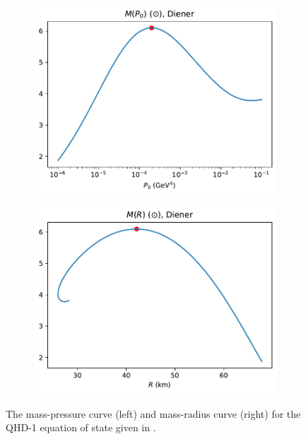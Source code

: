 \begin{figure}[t]
    \centering
    \begin{subfigure}{.5\textwidth}
        \includegraphics[width=\textwidth]{images/qhd1/p0_analysis.pdf}
    \end{subfigure}%
    \begin{subfigure}{.5\textwidth}
        \includegraphics[width=\textwidth]{images/qhd1/r_analysis.pdf}
    \end{subfigure}
    \caption{The mass-pressure curve (left) and mass-radius curve (right) for the QHD-1 equation of state given in \autocite{diener_2008}.}
    \label{fig: qhd1 mass radius pressure}
\end{figure}

